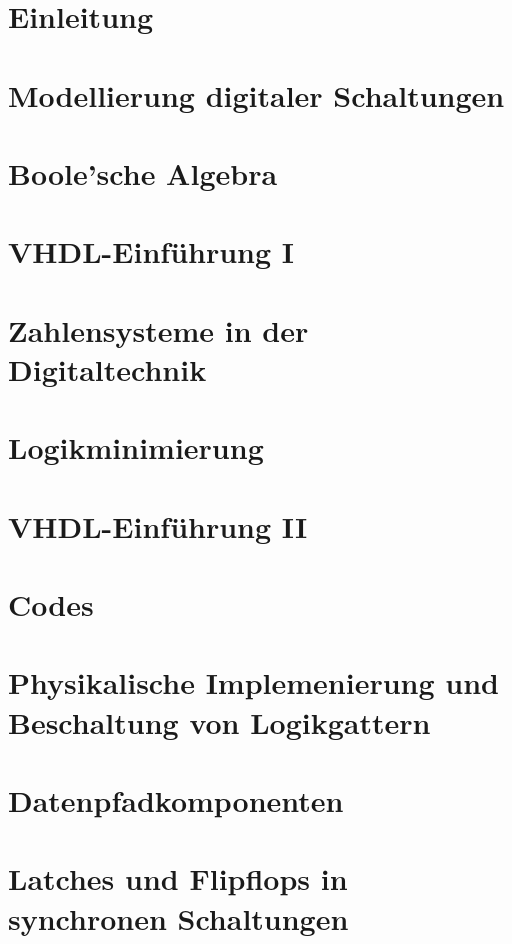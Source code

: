 \section{Einleitung}

\section{Modellierung digitaler Schaltungen}

\section{Boole'sche Algebra}

\section{VHDL-Einführung I}

\section{Zahlensysteme in der Digitaltechnik}

\section{Logikminimierung}

\section{VHDL-Einführung II}

\section{Codes}

\section{Physikalische Implemenierung und Beschaltung von Logikgattern}

\section{Datenpfadkomponenten}


\section{Latches und Flipflops in synchronen Schaltungen}

